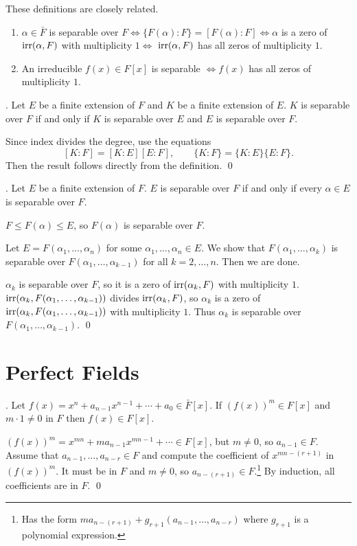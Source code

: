 \rmk These definitions are closely related.
\begin{enumerate}
    \item \(\alpha \in \bar{F}\) is separable over \(F \iff \{F(\alpha) : F\} = [F(\alpha) : F] \iff \alpha\) is a zero of \(\mathrm{irr}(\alpha, F)\) with multiplicity \(1 \iff\) \(\mathrm{irr}(\alpha, F)\) has all zeros of multiplicity \(1\).
    \item An irreducible \(f(x) \in F[x]\) is separable \(\iff f(x)\) has all zeros of multiplicity \(1\).
\end{enumerate}

\thm. Let \(E\) be a finite extension of \(F\) and \(K\) be a finite extension of \(E\). \(K\) is separable over \(F\) if and only if \(K\) is separable over \(E\) and \(E\) is separable over \(F\).

\pf Since index divides the degree, use the equations
\[
    [K : F] = [K : E][E : F], \qquad \{K : F\} = \{K : E\}\{E : F\}.
\]
Then the result follows directly from the definition. \qed

\cor. Let \(E\) be a finite extension of \(F\). \(E\) is separable over \(F\) if and only if every \(\alpha \in E\) is separable over \(F\).

\pf \note{\mimp} \(F \leq F(\alpha) \leq E\), so \(F(\alpha)\) is separable over \(F\).

\note{\mimpd} Let \(E = F(\alpha_1, \dots, \alpha_n)\) for some \(\alpha_1, \dots, \alpha_n \in E\). We show that \(F(\alpha_1, \dots, \alpha_k)\) is separable over \(F(\alpha_1, \dots, \alpha_{k-1})\) for all \(k = 2, \dots, n\). Then we are done.

\(\alpha_k\) is separable over \(F\), so it is a zero of \(\mathrm{irr}(\alpha_k, F)\) with multiplicity \(1\). \(\mathrm{irr}(\alpha_k, F(\alpha_1, \dots, \alpha_{k-1}))\) divides \(\mathrm{irr}(\alpha_k, F)\), so \(\alpha_k\) is a zero of \(\mathrm{irr}(\alpha_k, F(\alpha_1, \dots, \alpha_{k-1}))\) with multiplicity \(1\). Thus \(\alpha_k\) is separable over \(F(\alpha_1, \dots, \alpha_{k-1})\). \qed

\section*{Perfect Fields}

\lemma. Let \(f(x) = x^n + a_{n-1}x^{n-1} + \cdots + a_0 \in \bar{F}[x]\). If \((f(x))^m \in F[x]\) and \(m \cdot 1 \neq 0\) in \(F\) then \(f(x) \in F[x]\).

\pf \((f(x))^m = x^{mn} + ma_{n-1}x^{mn-1} + \cdots \in F[x]\), but \(m \neq 0\), so \(a_{n-1} \in F\). Assume that \(a_{n-1}, \dots, a_{n-r} \in F\) and compute the coefficient of \(x^{mn - (r+1)}\) in \((f(x))^m\). It must be in \(F\) and \(m \neq 0\), so \(a_{n-(r+1)} \in F\).\footnote{Has the form \(ma_{n-(r+1)}+g_{r+1}(a_{n-1}, \dots, a_{n-r})\) where \(g_{r+1}\) is a polynomial expression.} By induction, all coefficients are in \(F\). \qed

